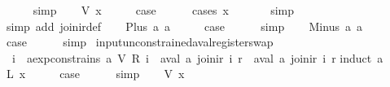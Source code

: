 \begin{isabellebody}
\ \ \ \ \isamarkupfalse%
\ simp\isanewline
{}\isamarkupfalse%
\isanewline
\ \ \isamarkupfalse%
\ {\isacharparenleft}V\ x{\isacharparenright}\isanewline
\ \ \isamarkupfalse%
\ \isamarkupfalse%
\ {\isacharquery}case\isanewline
\ \ \ \ \isamarkupfalse%
\ {\isacharparenleft}cases\ x{\isacharparenright}\isanewline
\ \ \ \ \ \isamarkupfalse%
\ simp\isanewline
\ \ \ \ \isamarkupfalse%
\ {\isacharparenleft}simp\ add{\isacharcolon}\ join{\isacharunderscore}ir{\isacharunderscore}def{\isacharparenright}\isanewline
{}\isamarkupfalse%
\isanewline
\ \ \isamarkupfalse%
\ {\isacharparenleft}Plus\ a{}\ a{}{\isacharparenright}\isanewline
\ \ \isamarkupfalse%
\ \isamarkupfalse%
\ {\isacharquery}case\isanewline
\ \ \ \ \isamarkupfalse%
\ simp\isanewline
{}\isamarkupfalse%
\isanewline
\ \ \isamarkupfalse%
\ {\isacharparenleft}Minus\ a{}\ a{}{\isacharparenright}\isanewline
\ \ \isamarkupfalse%
\ \isamarkupfalse%
\ {\isacharquery}case\isanewline
\ \ \ \ \isamarkupfalse%
\ simp\isanewline
{}\isamarkupfalse%
%
\endisatagproof
{\isafoldproof}%
%
\isadelimproof
\isanewline
%
\endisadelimproof
\isanewline
{}\isamarkupfalse%
\ input{\isacharunderscore}unconstrained{\isacharunderscore}aval{\isacharunderscore}register{\isacharunderscore}swap{\isacharcolon}\isanewline
\ \ {\isachardoublequoteopen}{\isasymforall}i{\isachardot}\ {\isasymnot}\ aexp{\isacharunderscore}constrains\ a\ {\isacharparenleft}V\ {\isacharparenleft}R\ i{\isacharparenright}{\isacharparenright}\ {\isasymLongrightarrow}\ aval\ a\ {\isacharparenleft}join{\isacharunderscore}ir\ i\ r{\isacharparenright}\ {\isacharequal}\ aval\ a\ {\isacharparenleft}join{\isacharunderscore}ir\ i\ r{\isacharprime}{\isacharparenright}{\isachardoublequoteclose}\isanewline
%
\isadelimproof
%
\endisadelimproof
%
\isatagproof
{}\isamarkupfalse%
{\isacharparenleft}induct\ a{\isacharparenright}\isanewline
{}\isamarkupfalse%
\ {\isacharparenleft}L\ x{\isacharparenright}\isanewline
\ \ \isamarkupfalse%
\ \isamarkupfalse%
\ {\isacharquery}case\isanewline
\ \ \ \ \isamarkupfalse%
\ simp\isanewline
{}\isamarkupfalse%
\isanewline
\ \ \isamarkupfalse%
\ {\isacharparenleft}V\ x{\isacharparenright}\isanewline

\end{isabellebody}
